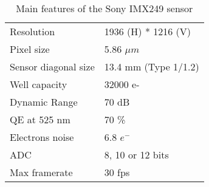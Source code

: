 \begin{table}[!h]
  \centering
  \caption{Main features of the Sony IMX249 sensor}
  \label{tab:IMX249}
  \begin{tabular}{ll}
    \toprule
    Resolution           & 1936 (H) * 1216 (V)  \\
    Pixel size           & 5.86 $\mu m$         \\
    Sensor diagonal size & 13.4 mm (Type 1/1.2) \\
    Well capacity        & 32000 e-             \\
    Dynamic Range        & 70 dB                \\
    QE at 525 nm         & 70 \%                \\
    Electrons noise      & 6.8 $e^{-}$          \\
    ADC                  & 8, 10 or 12 bits     \\
    Max framerate        & 30 fps               \\
    \bottomrule
  \end{tabular}
\end{table}